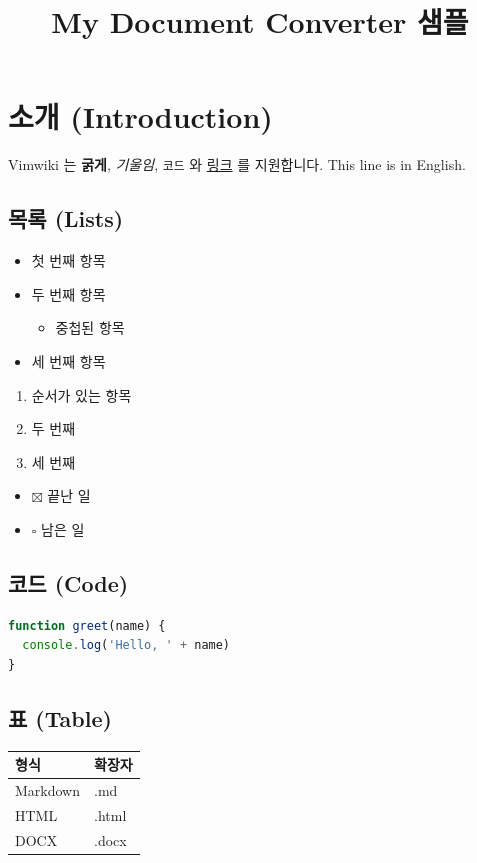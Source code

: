 \documentclass[11pt]{article}
\title{My Document Converter 샘플}
\date{}
\begin{document}
\maketitle

\section*{소개 (Introduction)}\label{소개-introduction}

Vimwiki 는 \textbf{굵게}, \emph{기울임}, \verb|코드| 와
\href{https://example.com}{링크} 를 지원합니다.
This line is in English.

\subsection*{목록 (Lists)}\label{목록-lists}

\begin{itemize}
\item 첫 번째 항목
\item 두 번째 항목
\begin{itemize}
\item 중첩된 항목
\end{itemize}
\item 세 번째 항목
\end{itemize}

\begin{enumerate}
\item 순서가 있는 항목
\item 두 번째
\item 세 번째
\end{enumerate}

\begin{itemize}
\item $\boxtimes$ 끝난 일
\item $\square$ 남은 일
\end{itemize}

\subsection*{코드 (Code)}\label{코드-code}

\begin{lstlisting}[language=js]
function greet(name) {
  console.log('Hello, ' + name)
}
\end{lstlisting}

\subsection*{표 (Table)}\label{표-table}

\begin{table}[htbp]
\centering
\begin{tabular}{ll}
\toprule
형식 & 확장자 \\
\midrule
Markdown & .md \\
HTML & .html \\
DOCX & .docx \\
\bottomrule
\end{tabular}
\end{table}
\end{document}
